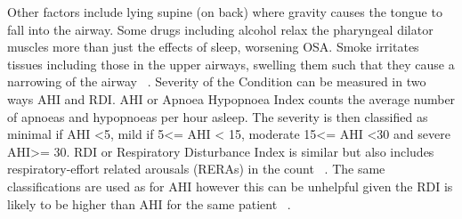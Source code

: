 Other factors include lying supine (on back) where gravity causes the tongue to fall into the airway. Some drugs including alcohol relax the pharyngeal dilator muscles more than just the effects of sleep, worsening OSA. Smoke irritates tissues including those in the upper airways, swelling them such that they cause a narrowing of the airway ~\cite{apneosotherfactors}.
 Severity of the Condition can be measured in two ways AHI and RDI. AHI or Apnoea Hypopnoea Index counts the average number of apnoeas and hypopnoeas per hour asleep. The severity is then classified as minimal if AHI <5, mild if 5<= AHI < 15, moderate 15<= AHI <30 and severe AHI>= 30. RDI or Respiratory Disturbance Index is similar but also includes respiratory-effort related arousals (RERAs) in the count ~\cite{AHI}. The same classifications are used as for AHI however this can be unhelpful given the RDI is likely to be higher than AHI for the same patient ~\cite{epstein2009clinical}.
